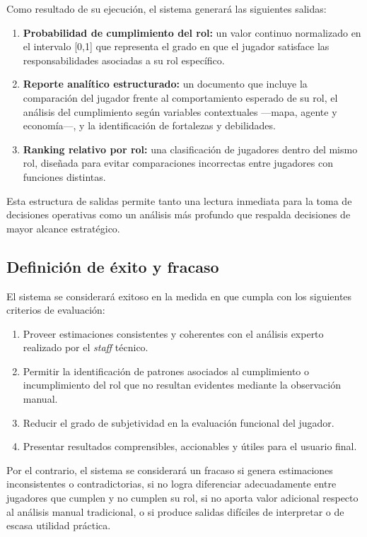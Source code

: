 \documentclass{ULBreport} %
\begin{document}
Como resultado de su ejecución, el sistema generará las siguientes salidas:

\begin{enumerate}
    \item \textbf{Probabilidad de cumplimiento del rol:} un valor continuo normalizado en el intervalo [0,1] que representa el grado en que el jugador satisface las responsabilidades asociadas a su rol específico.
    \item \textbf{Reporte analítico estructurado:} un documento que incluye la comparación del jugador frente al comportamiento esperado de su rol, el análisis del cumplimiento según variables contextuales ---mapa, agente y economía---, y la identificación de fortalezas y debilidades.
    \item \textbf{Ranking relativo por rol:} una clasificación de jugadores dentro del mismo rol, diseñada para evitar comparaciones incorrectas entre jugadores con funciones distintas.
\end{enumerate}

Esta estructura de salidas permite tanto una lectura inmediata para la toma de decisiones operativas como un análisis más profundo que respalda decisiones de mayor alcance estratégico.

\subsection{Definición de éxito y fracaso}

El sistema se considerará exitoso en la medida en que cumpla con los siguientes criterios de evaluación:

\begin{enumerate}
    \item Proveer estimaciones consistentes y coherentes con el análisis experto realizado por el \textit{staff} técnico.
    \item Permitir la identificación de patrones asociados al cumplimiento o incumplimiento del rol que no resultan evidentes mediante la observación manual.
    \item Reducir el grado de subjetividad en la evaluación funcional del jugador.
    \item Presentar resultados comprensibles, accionables y útiles para el usuario final.
\end{enumerate}

Por el contrario, el sistema se considerará un fracaso si genera estimaciones inconsistentes o contradictorias, si no logra diferenciar adecuadamente entre jugadores que cumplen y no cumplen su rol, si no aporta valor adicional respecto al análisis manual tradicional, o si produce salidas difíciles de interpretar o de escasa utilidad práctica.
\end{document}
